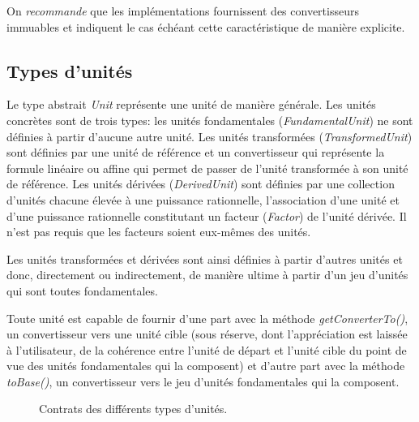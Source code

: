 \documentclass[a4paper,twoside,10pt]{article}
\begin{document}
On \emph{recommande} que les implémentations fournissent des convertisseurs immuables et indiquent le cas échéant cette
caractéristique de manière explicite.

\subsection{Types d'unités}

Le type abstrait \emph{Unit} représente une unité de manière générale. Les unités concrètes sont de trois types: les
unités fondamentales (\emph{FundamentalUnit}) ne sont définies à partir d'aucune autre unité. Les unités transformées
(\emph{TransformedUnit}) sont définies par une unité de référence et un convertisseur qui représente la formule linéaire
ou affine qui permet de passer de l'unité transformée à son unité de référence. Les unités dérivées (\emph{DerivedUnit})
sont définies par une collection d'unités chacune élevée à une puissance rationnelle, l'association d'une unité et d'une
puissance rationnelle constitutant un facteur (\emph{Factor}) de l'unité dérivée. Il n'est pas requis que les facteurs
soient eux-mêmes des unités.

Les unités transformées et dérivées sont ainsi définies à partir d'autres unités et donc, directement ou indirectement,
de manière ultime à partir d'un jeu d'unités qui sont toutes fondamentales.

Toute unité est capable de fournir d'une part avec la méthode \emph{getConverterTo​()}, un convertisseur vers une unité
cible (sous réserve, dont l'appréciation est laissée à l'utilisateur, de la cohérence entre l'unité de départ et l'unité
cible du point de vue des unités fondamentales qui la composent) et d'autre part avec la méthode \emph{toBase()},
un convertisseur vers le jeu d'unités fondamentales qui la composent.

\begin{figure}[!h]
\caption{Contrats des différents types d'unités.}
\end{figure}
\end{document}
